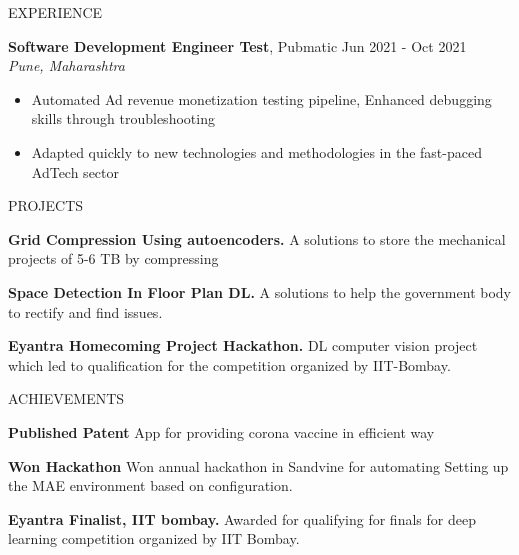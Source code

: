 \documentclass{resume} %
\begin{document}
\begin{rSection}{EXPERIENCE}
\begin{itemize}
 \end{itemize}
 
\textbf{Software Development Engineer Test}, Pubmatic \hfill Jun 2021 - Oct 2021\\
 \hfill \textit{Pune, Maharashtra}
 \begin{itemize}
    \itemsep -6pt 
     \item Automated Ad revenue monetization testing pipeline, Enhanced debugging skills through troubleshooting
    \item Adapted quickly to new technologies and methodologies in the fast-paced AdTech sector
 \end{itemize}
\end{rSection} 


\begin{rSection}{PROJECTS}

\itemsep -6pt 
\item \textbf{Grid Compression Using autoencoders.} {A solutions to store the mechanical projects of 5-6 TB by compressing}
\item \textbf{Space Detection In Floor Plan DL.} {A solutions to help the government body to rectify and find issues.}
\item \textbf{Eyantra Homecoming Project Hackathon.} {DL computer vision project which led to qualification for the competition organized by IIT-Bombay.}
\end{rSection} 



\begin{rSection}{ACHIEVEMENTS}

\itemsep -6pt 
\item \textbf{Published Patent} {App for providing corona vaccine in efficient way}
\item \textbf{Won Hackathon} {Won annual hackathon in Sandvine for automating Setting up the MAE environment based on configuration.}
\item \textbf{Eyantra Finalist, IIT bombay.} {Awarded for qualifying for finals for deep learning competition organized by IIT Bombay.}
\end{rSection} 
\end{document}
